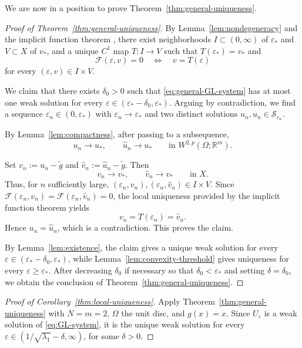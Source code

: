 \documentclass[11pt]{amsart}
\theoremstyle{definition}
\theoremstyle{plain}
\newcommand{\R}{\mathbb{R}}
\numberwithin{equation}{section}
\begin{document}
We are now in a position to prove
Theorem~\ref{thm:general-uniqueness}.

\begin{proof}[Proof of Theorem~\ref{thm:general-uniqueness}]
	By Lemma~\ref{lem:nondegeneracy} and the implicit function theorem
	\cite[Theorem~15.1 and Corollary~15.1]{Deimling1985}, there exist
	neighborhoods $I\subset(0,\infty)$ of $\varepsilon_*$ and
	$V\subset X$ of $v_*$, and a unique $C^1$ map
	$T\colon I\to V$ such that $T(\varepsilon_*)=v_*$ and
	\[
		\mathcal{F}(\varepsilon,v)=0
		\quad\Longleftrightarrow\quad
		v=T(\varepsilon)
	\]
	for every $(\varepsilon,v)\in I\times V$.


We claim that there exists $\delta_0>0$ such that
	\eqref{eq:general-GL-system} has at most one weak solution for every
	$\varepsilon\in(\varepsilon_*-\delta_0,\varepsilon_*)$.
	Arguing by contradiction, we find a sequence
	$\varepsilon_n\in(0,\varepsilon_*)$ with
	$\varepsilon_n\to\varepsilon_*$ and two distinct solutions
	$u_n,\widehat{u}_n\in\mathcal{S}_{\varepsilon_n}$.



	By Lemma~\ref{lem:compactness}, after passing to a subsequence,
	\[
		u_n\to u_*,
		\qquad
		\widehat{u}_n\to u_*
		\qquad\text{in }W^{2,p}(\Omega;\R^m).
	\]


	Set $v_n:=u_n-\widetilde g$ and
	$\widehat{v}_n:=\widehat{u}_n-\widetilde g$. Then
	\[
		v_n\to v_*,
		\qquad
		\widehat{v}_n\to v_*
		\qquad\text{in }X.
	\]
	Thus, for $n$ sufficiently large,
	$(\varepsilon_n,v_n),(\varepsilon_n,\widehat{v}_n)\in I\times V$.
	Since
	$\mathcal{F}(\varepsilon_n,v_n)=
	\mathcal{F}(\varepsilon_n,\widehat{v}_n)=0$, the local uniqueness provided
	by the implicit function theorem yields
	\[
		v_n=T(\varepsilon_n)=\widehat{v}_n.
	\]
	Hence $u_n=\widehat{u}_n$, which is a contradiction. This proves
	the claim.


By Lemma~\ref{lem:existence}, the claim gives a unique weak solution for
	every $\varepsilon\in(\varepsilon_*-\delta_0,\varepsilon_*)$, while
	Lemma~\ref{lem:convexity-threshold} gives uniqueness for every
	$\varepsilon\geq\varepsilon_*$. After decreasing $\delta_0$ if
	necessary so that $\delta_0<\varepsilon_*$ and setting
	$\delta=\delta_0$, we obtain the conclusion of
	Theorem~\ref{thm:general-uniqueness}.

\end{proof}

\begin{proof}[Proof of Corollary~\ref{thm:local-uniqueness}]
	Apply Theorem~\ref{thm:general-uniqueness} with $N=m=2$,
	$\Omega$ the unit disc, and $g(x)=x$.
	Since $U_\varepsilon$ is a weak solution of \eqref{eq:GL-system}, it is
	the unique weak solution for every
	$\varepsilon\in(1/\sqrt{\lambda_1}-\delta,\infty)$, for some
	$\delta>0$.
\end{proof}
\end{document}
